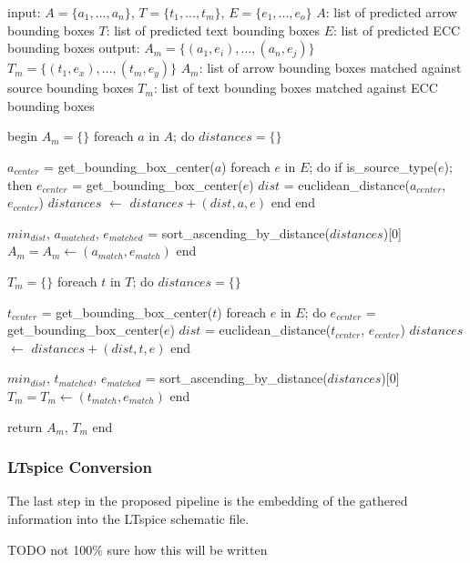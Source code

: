 \begin{algorithm}[caption={Annotation Matching TODO caption to bottom and format}, label={alg:annotation_matching}]
input:  $A = \{a_1, ..., a_n\}$, $T = \{t_1, ..., t_m\}$, $E = \{e_1, ..., e_o\}$
        $A$: list of predicted arrow bounding boxes
        $T$: list of predicted text bounding boxes
        $E$: list of predicted ECC bounding boxes
output: $A_m = \{(a_1, e_i), ..., (a_n, e_j)\}$
        $T_m = \{(t_1, e_x), ..., (t_m, e_y)\}$
        $A_m$: list of arrow bounding boxes matched against source bounding boxes
        $T_m$: list of text bounding boxes matched against ECC bounding boxes

begin
    $A_m = \{\}$
    foreach $a$ in $A$; do
        $distances = \{\}$

        $a_{center}$ = get_bounding_box_center($a$)
        foreach $e$ in $E$; do
            if is_source_type($e$); then
                $e_{center}$ = get_bounding_box_center($e$)
                $dist$ = euclidean_distance($a_{center}$, $e_{center}$)
                $distances$ $\gets$ $distances + (dist, a, e)$
            end
        end

        $min_{dist}$, $a_{matched}$, $e_{matched}$ = sort_ascending_by_distance($distances$)[0]
        $A_m = A_m \gets (a_{match}, e_{match})$
    end

    $T_m = \{\}$
    foreach $t$ in $T$; do
        $distances = \{\}$

        $t_{center}$ = get_bounding_box_center($t$)
        foreach $e$ in $E$; do
            $e_{center}$ = get_bounding_box_center($e$)
            $dist$ = euclidean_distance($t_{center}$, $e_{center}$)
            $distances$ $\gets$ $distances + (dist, t, e)$
        end

        $min_{dist}$, $t_{matched}$, $e_{matched}$ = sort_ascending_by_distance($distances$)[0]
        $T_m = T_m \gets (t_{match}, e_{match})$
    end

    return $A_m$, $T_m$
end
\end{algorithm}


\subsubsection{LTspice Conversion}

The last step in the proposed pipeline is the embedding of the gathered information into the LTspice schematic file.

TODO not 100\% sure how this will be written
